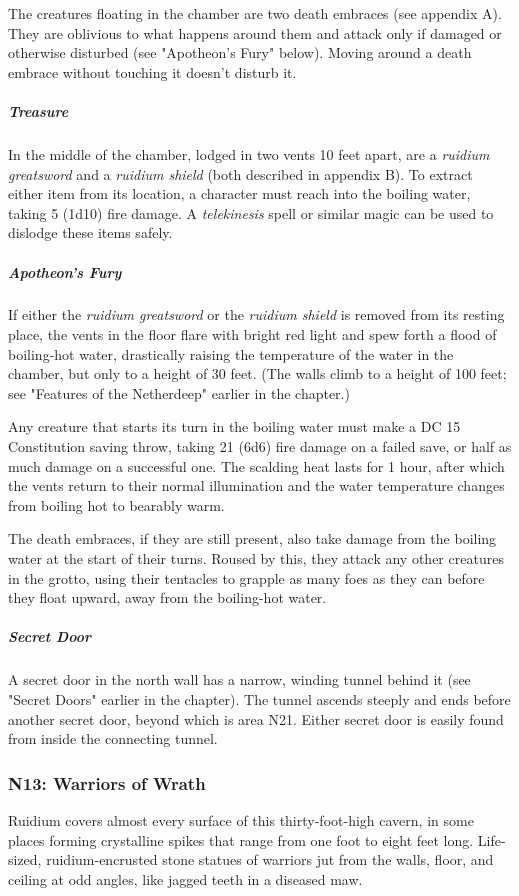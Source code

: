 \documentclass[10pt,a4paper,twoside,fancy,bg=print,twocolumn,openany,nodeprecatedcode]{dndbook}
\begin{document}
The creatures floating in the chamber are two death embraces (see appendix A). They are oblivious to what happens around them and attack only if damaged or otherwise disturbed (see "Apotheon's Fury" below). Moving around a death embrace without touching it doesn't disturb it.

\subparagraph{Treasure}
In the middle of the chamber, lodged in two vents 10 feet apart, are a \textit{ruidium greatsword} and a \textit{ruidium shield} (both described in appendix B). To extract either item from its location, a character must reach into the boiling water, taking 5 (1d10) fire damage. A \textit{telekinesis} spell or similar magic can be used to dislodge these items safely.

\subparagraph{Apotheon's Fury}
If either the \textit{ruidium greatsword} or the \textit{ruidium shield} is removed from its resting place, the vents in the floor flare with bright red light and spew forth a flood of boiling-hot water, drastically raising the temperature of the water in the chamber, but only to a height of 30 feet. (The walls climb to a height of 100 feet; see "Features of the Netherdeep" earlier in the chapter.)

Any creature that starts its turn in the boiling water must make a DC 15 Constitution saving throw, taking 21 (6d6) fire damage on a failed save, or half as much damage on a successful one. The scalding heat lasts for 1 hour, after which the vents return to their normal illumination and the water temperature changes from boiling hot to bearably warm.

The death embraces, if they are still present, also take damage from the boiling water at the start of their turns. Roused by this, they attack any other creatures in the grotto, using their tentacles to grapple as many foes as they can before they float upward, away from the boiling-hot water.

\subparagraph{Secret Door}
A secret door in the north wall has a narrow, winding tunnel behind it (see "Secret Doors" earlier in the chapter). The tunnel ascends steeply and ends before another secret door, beyond which is area N21. Either secret door is easily found from inside the connecting tunnel.

\subsubsection{N13: Warriors of Wrath}
\begin{DndReadAloud}{}
Ruidium covers almost every surface of this thirty-foot-high cavern, in some places forming crystalline spikes that range from one foot to eight feet long. Life-sized, ruidium-encrusted stone statues of warriors jut from the walls, floor, and ceiling at odd angles, like jagged teeth in a diseased maw.

\end{DndReadAloud}
\end{document}
